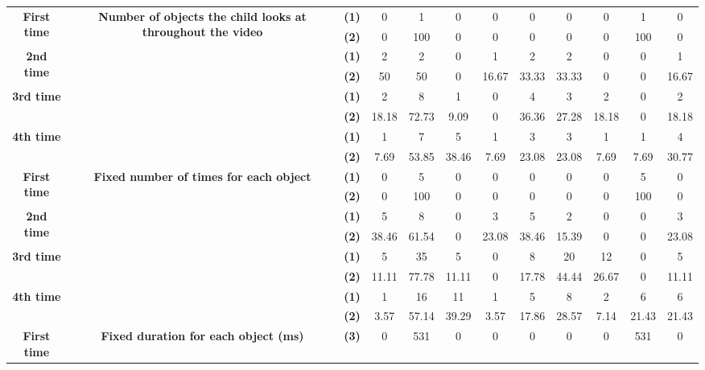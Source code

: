 \begin{table}
{\begin{tabular}{|c|c|c|c|c|c|c|c|c|c|c|c|}
         \multirow{2}{*}{\textbf{First time}}& \multirow{8}{*}{\parbox{1.5cm}{\textbf{Number of objects the child looks at throughout the video}}} & \textbf{(1)} & 0 & 1 & 0 & 0 & 0 & 0 & 0 & 1 & 0\\  \cline{3-12}
         &  & \textbf{(2)} & 0 & 100 & 0 & 0 & 0 & 0 & 0 & 100 & 0\\   \cline{3-12} \cline{1-1}
         \multirow{2}{*}{\textbf{2nd time}}&  & \textbf{(1)} & 2 & 2 & 0 & 1 & 2 & 2 & 0 & 0 & 1\\ \cline{3-12}
         &  & \textbf{(2)} & 50 & 50 & 0 & 16.67 & 33.33 & 33.33 & 0 & 0 &16.67\\ \cline{3-12} \cline{1-1}
         \multirow{2}{*}{\textbf{3rd time}}&  & \textbf{(1)} & 2 & 8 & 1 & 0 & 4 & 3 & 2 & 0 &2\\ \cline{3-12}
         &  & \textbf{(2)} & 18.18 & 72.73 & 9.09 & 0 & 36.36 & 27.28 & 18.18 & 0 & 18.18\\ \cline{3-12} \cline{1-1}
         \multirow{2}{*}{\textbf{4th time}}&  & \textbf{(1)} & 1 & 7 & 5 & 1 & 3 & 3 & 1 & 1 & 4\\ \cline{3-12}
         &  & \textbf{(2)} & 7.69 & 53.85 & 38.46 & 7.69 & 23.08 & 23.08 & 7.69 & 7.69 & 30.77\\ \hline
         \multirow{2}{*}{\textbf{First time}}& \multirow{8}{*}{\parbox{1.5cm}{\textbf{Fixed number of times for each object}}} & \textbf{(1)} & 0 & 5 & 0 & 0 & 0 & 0 & 0 & 5 & 0\\ \cline{3-12}
         &  & \textbf{(2)} & 0 & 100 & 0 & 0 & 0 & 0 & 0 & 100 & 0\\ \cline{3-12} \cline{1-1}
         \multirow{2}{*}{\textbf{2nd time}}&  & \textbf{(1)} & 5 & 8 & 0 & 3 & 5 & 2 & 0 & 0 & 3\\ \cline{3-12}
         &  & \textbf{(2)} & 38.46 & 61.54 & 0 & 23.08 & 38.46 & 15.39 & 0 & 0 & 23.08\\ \cline{3-12} \cline{1-1}
         \multirow{2}{*}{\textbf{3rd time}}&  & \textbf{(1)} & 5 & 35 & 5 & 0 & 8 & 20 & 12 & 0 &5\\ \cline{3-12}
         &  & \textbf{(2)} & 11.11 & 77.78 & 11.11 & 0 & 17.78 & 44.44 & 26.67 & 0 &11.11\\ \cline{3-12} \cline{1-1}
         \multirow{2}{*}{\textbf{4th time}}&  & \textbf{(1)} & 1 & 16 & 11 & 1 & 5 & 8 & 2 & 6 &6\\ \cline{3-12}
         &  & \textbf{(2)} & 3.57 & 57.14 & 39.29 & 3.57 & 17.86 & 28.57 & 7.14 & 21.43 &21.43\\ \hline
         \multirow{2}{*}{\textbf{First time}}& \multirow{8}{*}{\parbox{1.5cm}{\textbf{Fixed duration for each object (ms)}}} & \textbf{(3)} & 0 & 531 & 0 & 0 & 0 & 0 & 0 & 531 &0\\ \cline{3-12}

\end{tabular}}
\end{table}
